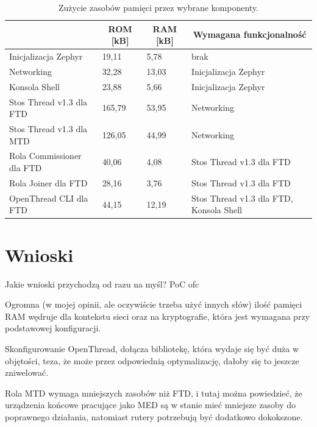     \begin{table}[H]
        \centering
        \caption{Zużycie zasobów pamięci przez wybrane komponenty.}
        \begin{tabular}{|l|l|l|l|}
            \hline
            \rowcolor{gray!20}
            \multicolumn{1}{|c|}{Funkcjonalność} & \multicolumn{1}{c|}{ROM [kB]} & \multicolumn{1}{c|}{RAM [kB]} & \multicolumn{1}{c|}{Wymagana funkcjonalność} \\
            \hline
            Inicjalizacja Zephyr & 19,11 & 5,78 & brak\\
            \hline
            Networking & 32,28 & 13,03 & Inicjalizacja Zephyr\\
            \hline
            Konsola Shell & 23,88 & 5,66 & Inicjalizacja Zephyr\\
            \hline
            Stos Thread v1.3 dla FTD & 165,79 & 53,95 & Networking\\
            \hline
            Stos Thread v1.3 dla MTD & 126,05 & 44,99 & Networking\\
            \hline
            Rola Commissioner dla FTD & 40,06 & 4,08 & Stos Thread v1.3 dla FTD\\
            \hline
            Rola Joiner dla FTD & 28,16 & 3,76 & Stos Thread v1.3 dla FTD\\
            \hline
            OpenThread CLI dla FTD & 44,15 & 12,19 & Stos Thread v1.3 dla FTD, Konsola Shell\\
            \hline
        \end{tabular}
        \label{tab:component-memory-usage}
    \end{table}

\section{Wnioski}

Jakie wnioski przychodzą od razu na myśl? PoC ofc

Ogromna (w mojej opinii, ale oczywiście trzeba użyć innych słów) ilość pamięci RAM wędruje dla kontekstu sieci oraz na kryptografie, która jest wymagana przy podstawowej konfiguracji. 

Skonfigurowanie OpenThread, dołącza bibliotekę, która wydaje się być duża w objętości, teza, że może przez odpowiednią optymalizację, dałoby się to jeszcze zniwelować.

Rola MTD wymaga mniejszych zasobów niż FTD, i tutaj można powiedzieć, że urządzenia końcowe pracujące jako MED są w stanie mieć mniejsze zasoby do poprawnego działania, natomiast rutery potrzebują być dodatkowo dokokszone. 

